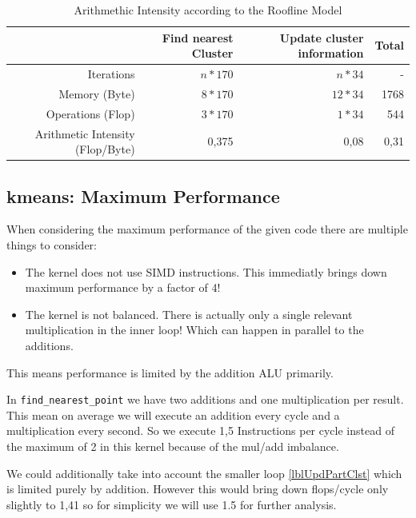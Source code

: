 \begin{table}[ht]
	\centering
	\caption{Arithmethic Intensity according to the Roofline Model}
	\label{tab:AI}
	\begin{tabular}{|r|r|r|r|}
		\hline
		& Find nearest Cluster & Update cluster information & Total \\ \hline
		Iterations           & $n * 170$            & $n*34$                     & -     \\ \hline
		Memory (Byte)              & $8*170$              & $12*34$                      & 1768  \\ \hline
		Operations (Flop)          & $3*170$              & $1*34$                       & 544   \\ \hline
		Arithmetic Intensity (Flop/Byte) & 0,375                & 0,08                       & 0,31  \\ \hline
	\end{tabular}
\end{table}

\subsection{kmeans: Maximum Performance}

When considering the maximum performance of the given code there are multiple things to consider:

\begin{itemize}
	\item The kernel does not use SIMD instructions. This immediatly brings down maximum performance by a factor of 4!
	\item The kernel is not balanced. There is actually only a single relevant multiplication in the inner loop! Which can happen in parallel to the additions.
\end{itemize}

This means performance is limited by the addition ALU primarily.

In \texttt{find\_nearest\_point} we have two additions and one multiplication per result. This mean on average we will execute an addition every cycle and a multiplication every second.
So we execute 1,5 Instructions per cycle instead of the maximum of 2 in this kernel because of the mul/add imbalance.

We could additionally take into account the smaller loop \autoref{lblUpdPartClst} which is limited purely by addition.
However this would bring down flops/cycle only slightly to 1,41 so for simplicity we will use 1.5 for further analysis.

